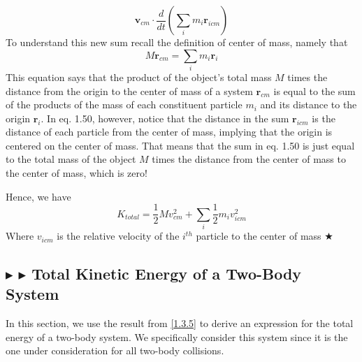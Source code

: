 \begin{equation}
    \mathbf{v}_{cm} \cdot \frac{d}{dt}\left(\sum_i m_i \mathbf{r}_{icm}\right)
\end{equation}
\noindent To understand this new sum recall the definition of center of mass, namely that
\begin{equation*}
    M\mathbf{r}_{cm} = \sum_i m_i\mathbf{r}_i
\end{equation*}
\noindent This equation says that the product of the object's total mass $M$ times the distance from the origin to the center of mass of a system $\mathbf{r}_{cm}$ is equal to the sum of the products of the mass of each constituent particle $m_i$ and its distance to the origin $\mathbf{r}_{i}$. In eq. 1.50, however, notice that the distance in the sum $\mathbf{r}_{icm}$ is the distance of each particle from the center of mass, implying that the origin is centered on the center of mass. That means that the sum in eq. 1.50 is just equal to the total mass of the object $M$ times the distance from the center of mass to the center of mass, which is zero!

\noindent Hence, we have
\begin{equation*}
    K_{total} = \frac12 M v_{cm}^2 + \sum_i \frac12 m_i v_{icm}^2
\end{equation*}
\noindent Where $v_{icm}$ is the relative velocity of the $i^{th}$ particle to the center of mass $\bigstar$

%
%
\subsection{\color{Goldenrod} $\blacktriangleright$ \color{Orchid} $\blacktriangleright$ \color{black} Total Kinetic Energy of a Two-Body System} \label{1.3.6}
In this section, we use the result from \ref{1.3.5} to derive an expression for the total energy of a two-body system. We specifically consider this system since it is the one under consideration for all two-body collisions.

